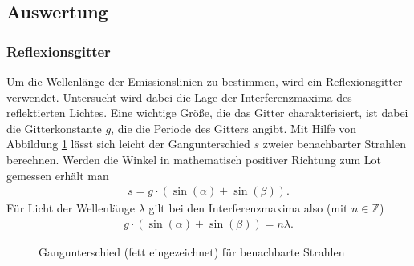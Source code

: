 \subsection{Auswertung}
\label{subsec:auswertung_spektrallinien}
\subsubsection{Reflexionsgitter}
Um die Wellenlänge der Emissionslinien zu bestimmen, wird ein Reflexionsgitter verwendet. Untersucht wird dabei die Lage der Interferenzmaxima des reflektierten Lichtes. Eine wichtige Größe, die das Gitter charakterisiert, ist dabei die Gitterkonstante $g$, die die Periode des Gitters angibt. Mit Hilfe von Abbildung \ref{Gangunterschied} lässt sich leicht der Gangunterschied $s$ zweier benachbarter Strahlen berechnen. Werden die Winkel in mathematisch positiver Richtung zum Lot gemessen erhält man
\begin{align*}
  s=g \cdot (\sin(\alpha)+\sin(\beta)).
\end{align*} 
Für Licht der Wellenlänge $\lambda$ gilt bei den Interferenzmaxima also (mit $n \in \mathbb{Z}$)
\begin{align}
  g \cdot (\sin(\alpha)+\sin(\beta)) = n\lambda.
  \label{equ:gitter}
\end{align}
\begin{figure}[h]
  \centering
  \caption{Gangunterschied (fett eingezeichnet) für benachbarte Strahlen}
  \label{Gangunterschied}
\end{figure}

